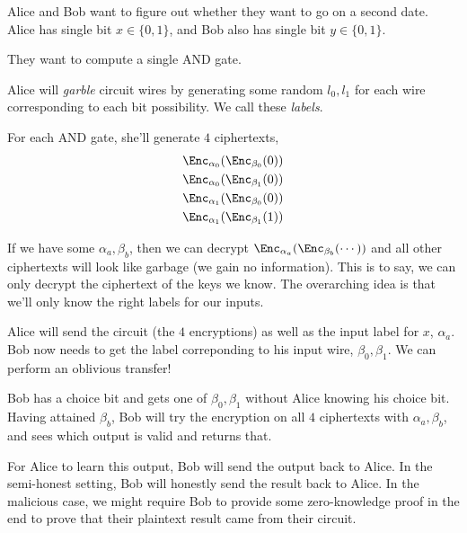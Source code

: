 \begin{example}
    Alice and Bob want to figure out whether they want to go on a second date. Alice has single bit $x\in\{0,1\}$, and Bob also has single bit $y\in\{0,1\}$.

    They want to compute a single \textsf{AND} gate.

    Alice will \emph{garble} circuit wires by generating some random $l_0, l_1$ for each wire corresponding to each bit possibility. We call these \emph{labels}.


    For each \textsf{AND} gate, she'll generate $4$ ciphertexts,
    \begin{align*}
        \Enc_{\alpha_0}(\Enc_{\beta_0}(0)) \\
        \Enc_{\alpha_0}(\Enc_{\beta_1}(0)) \\
        \Enc_{\alpha_1}(\Enc_{\beta_0}(0)) \\
        \Enc_{\alpha_1}(\Enc_{\beta_1}(1))
    \end{align*}

    If we have some $\alpha_a, \beta_b$, then we can decrypt $\Enc_{\alpha_a}(\Enc_{\beta_b}(\cdots))$ and all other ciphertexts will look like garbage (we gain no information). This is to say, we can only decrypt the ciphertext of the keys we know. The overarching idea is that we'll only know the right labels for our inputs.

    Alice will send the circuit (the $4$ encryptions) as well as the input label for $x$, $\alpha_a$. Bob now needs to get the label correponding to his input wire, $\beta_0, \beta_1$. We can perform an oblivious transfer!

    Bob has a choice bit and gets one of $\beta_0, \beta_1$ without Alice knowing his choice bit. Having attained $\beta_b$, Bob will try the encryption on all $4$ ciphertexts with $\alpha_a, \beta_b$, and sees which output is valid and returns that.

    For Alice to learn this output, Bob will send the output back to Alice. In the semi-honest setting, Bob will honestly send the result back to Alice. In the malicious case, we might require Bob to provide some zero-knowledge proof in the end to prove that their plaintext result came from their circuit.
\end{example}

